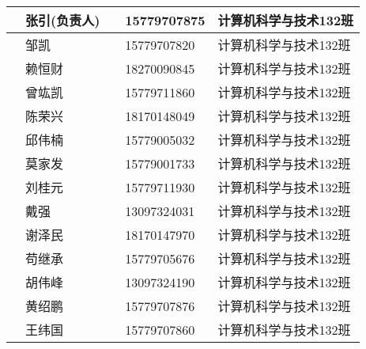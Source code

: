 \documentclass[12pt,a4paper]{article}
\begin{document}
\begin{CJK}{UTF8}{gbsn}
\begin{flushleft}
\begin{longtable}{|l|l|l|l|l|}
           & 张引(负责人)   &            & 15779707875 & 计算机科学与技术132班 \\ \hline
           & 邹凯           &            & 15779707820 & 计算机科学与技术132班 \\ \hline
           & 赖恒财         &            & 18270090845 & 计算机科学与技术132班 \\ \hline
           & 曾竑凯         &            & 15779711860 & 计算机科学与技术132班 \\ \hline
           & 陈荣兴         &            & 18170148049 & 计算机科学与技术132班 \\ \hline
           & 邱伟楠         &            & 15779005032 & 计算机科学与技术132班 \\ \hline
           & 莫家发         &            & 15779001733 & 计算机科学与技术132班 \\ \hline
           & 刘桂元         &            & 15779711930 & 计算机科学与技术132班 \\ \hline
           & 戴强           &            & 13097324031 & 计算机科学与技术132班 \\ \hline
           & 谢泽民         &            & 18170147970 & 计算机科学与技术132班 \\ \hline
           & 苟继承         &            & 15779705676 & 计算机科学与技术132班 \\ \hline
           & 胡伟峰         &            & 13097324190 & 计算机科学与技术132班 \\ \hline
           & 黄绍鹏         &            & 15779707876 & 计算机科学与技术132班 \\ \hline
           & 王纬国         &            & 15779707860 & 计算机科学与技术132班 \\ \hline


\end{longtable}
\end{flushleft}
\end{CJK}
\end{document}
